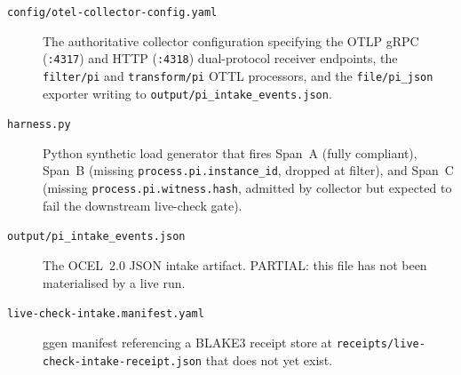 \begin{description}
  \item[\texttt{config/otel-collector-config.yaml}] The authoritative collector configuration
        specifying the OTLP gRPC (\texttt{:4317}) and HTTP (\texttt{:4318}) dual-protocol
        receiver endpoints, the \texttt{filter/pi} and \texttt{transform/pi} OTTL processors,
        and the \texttt{file/pi\_json} exporter writing to \texttt{output/pi\_intake\_events.json}.
  \item[\texttt{harness.py}] Python synthetic load generator that fires Span~A (fully
        compliant), Span~B (missing \texttt{process.pi.instance\_id}, dropped at filter),
        and Span~C (missing \texttt{process.pi.witness.hash}, admitted by collector but
        expected to fail the downstream live-check gate).
  \item[\texttt{output/pi\_intake\_events.json}] The OCEL~2.0 JSON intake artifact.
        PARTIAL: this file has not been materialised by a live run.
  \item[\texttt{live-check-intake.manifest.yaml}] ggen manifest referencing a BLAKE3 receipt
        store at \texttt{receipts/live-check-intake-receipt.json} that does not yet exist.
\end{description}

